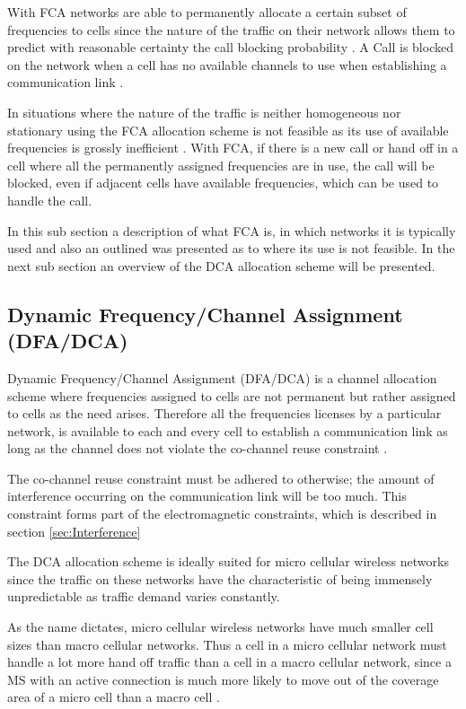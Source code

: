 With FCA networks are able to permanently allocate a certain subset of frequencies to cells since the nature of the traffic on their network allows them to predict with reasonable certainty the call blocking probability \cite{PrinciplesMobileCommunication}. A Call is blocked on the network when a cell has no available channels to use when establishing a communication link \cite{PrinciplesMobileCommunication}.

In situations where the nature of the traffic is neither homogeneous nor stationary using the FCA allocation scheme is not feasible as its use of available frequencies is grossly inefficient \cite{PrinciplesMobileCommunication}. With FCA, if there is a new call or hand off in a cell where all the permanently assigned frequencies are in use, the call will be blocked, even if adjacent cells have available frequencies, which can be used to handle the call\cite{PrinciplesMobileCommunication}.

In this sub section a description of what FCA is, in which networks it is typically used and also an outlined was presented as to  where its use is not feasible. In the next sub section an overview of the DCA allocation scheme will be presented.
\subsection{Dynamic Frequency/Channel Assignment (DFA/DCA)}
Dynamic Frequency/Channel Assignment (DFA/DCA) is a channel allocation scheme where frequencies assigned to cells are not permanent but rather assigned to cells as the need arises\cite{PrinciplesMobileCommunication}. Therefore all the frequencies licenses by a particular network, is available to each and every cell to establish a communication link as long as the channel does not violate the co-channel reuse constraint \cite{PrinciplesMobileCommunication}. 

The co-channel reuse constraint must be adhered to otherwise; the amount of interference occurring on the communication link will be too much. This constraint forms part of the electromagnetic constraints, which is described in section \ref{sec:Interference}

The DCA allocation scheme is ideally suited for micro cellular wireless networks since the traffic on these networks have the characteristic of being immensely unpredictable as traffic demand varies constantly\cite{PrinciplesMobileCommunication,WirelessCommunications,MobileWirelessCommunications}.

As the name dictates, micro cellular wireless networks have much smaller cell sizes than macro cellular networks. Thus a cell in a micro cellular network must handle a lot more hand off traffic than a cell in a macro cellular network, since a MS with an active connection is much more likely to move out of the coverage area of a micro cell than a macro cell \cite{PrinciplesMobileCommunication,WirelessCommunications,MobileWirelessCommunications}.

